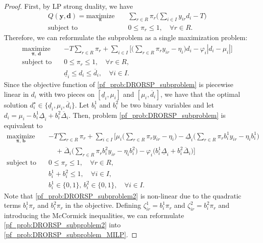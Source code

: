 \documentclass[preprint,review,11pt]{elsarticle}
\theoremstyle{definition}
\theoremstyle{remark}
\newcommand{\yb}{\pmb{y}}
\newcommand{\db}{\pmb{d}}
\newcommand{\bb}{\pmb{b}}
\newcommand{\pib}{\pmb{\pi}}
\newcommand{\dlb}{\underline{d}}
\newcommand{\dub}{\overline{d}}
\newcommand{\Deltalb}{\underline{\Delta}}
\newcommand{\Deltaub}{\overline{\Delta}}
\begin{document}
\begin{proof}
First, by LP strong duality, we have
%
\begin{subequations}
\begin{align}
Q(\yb,\db)=\underset{\pib}{\text{maximize}}\, \quad
&  \sum_{r\in R} \pi_r\Bigg(\sum_{i\in I} y_{ir}d_i - T\Bigg)\\
\text{subject to} \quad
& 0\leq \pi_r \leq 1,\quad\forall r\in R.
\end{align} \label{pf_prob:DRORSP_SS_dual}%
\end{subequations}
%
Therefore, we can reformulate the subproblem as a single maximization problem:
%
\begin{subequations}
\begin{align}
\underset{\pib,\,\db}{\text{maximize}}\, \quad
& -T\sum_{r\in R}\pi_r + \sum_{i\in I} \Bigg[\Bigg(\sum_{r\in R}\pi_r y_{ir} -\eta_i \Bigg) d_i -\varphi_i|d_i-\mu_i| \Bigg]\\
\text{subject to} \quad
& 0\leq \pi_r\leq 1,\quad\forall r\in R,\\
& \dlb_i \leq d_i \leq \dub_i,\quad\forall i\in I.
\end{align} \label{pf_prob:DRORSP_subproblem}%
\end{subequations}
%
Since the objective function of \eqref{pf_prob:DRORSP_subproblem} is piecewise linear in $d_i$ with two pieces on $[\dlb_i,\mu_i]$ and $[\mu_i,\dub_i]$, we have that the optimal solution $d_i^\star\in\{\dlb_i,\mu_i,\dub_i\}$. Let $b^1_i$ and $b^2_i$ be two binary variables and let $d_i=\mu_i - b^1_i\Deltalb_i + b^2_i\Deltaub_i$. Then, problem \eqref{pf_prob:DRORSP_subproblem} is equivalent to
%
\begin{subequations}
\begin{align}
\underset{\pib,\,\bb}{\text{maximize}}\, \quad
& -T\sum_{r\in R}\pi_r + \sum_{i\in I} \Bigg[\mu_i\Bigg(\sum_{r\in R}\pi_r y_{ir} - \eta_i \Bigg) - \Deltalb_i \Bigg(\sum_{r\in R}\pi_r b^1_i y_{ir} -\eta_i b^1_i \Bigg) \nonumber \\
& \quad  + \Deltaub_i \Bigg(\sum_{r\in R} \pi_r b^2_i y_{ir} - \eta_i b^2_i \Bigg)  -\varphi_i\Big(b^1_i\Deltalb_i + b^2_i \Deltaub_i\Big)  \Bigg]\\
\text{subject to} \quad
& 0\leq \pi_r\leq 1,\quad\forall r\in R,\\
& b^1_i + b^2_i \leq 1,\quad\forall i\in I,\\
& b^1_i\in\{0,1\},\, b^2_i\in\{0,1\},\quad\forall i\in I.
\end{align} \label{pf_prob:DRORSP_subproblem2}%
\end{subequations}
%
Note that \eqref{pf_prob:DRORSP_subproblem2} is non-linear due to the quadratic terms $b^1_i\pi_r$ and $b^2_i\pi_r$ in the objective. Defining $\zeta^1_{ir}=b^1_i\pi_r$ and $\zeta^2_{ir}=b^2_i\pi_r$ and introducing the McCormick inequalities, we can reformulate \eqref{pf_prob:DRORSP_subproblem2} into \eqref{pf_prob:DRORSP_subproblem_MILP}.
\end{proof}
\end{document}
